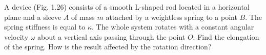 
\item A device (Fig. 1.26) consists of a smooth L-shaped rod located in a horizontal plane and a sleeve \( A \) of mass \( m \) attached by a weightless spring to a point \( B \). The spring stiffness is equal to \( \kappa \). The whole system rotates with a constant angular velocity \( \omega \) about a vertical axis passing through the point \( O \). Find the elongation of the spring. How is the result affected by the rotation direction?
    \begin{center}
    \end{center}
